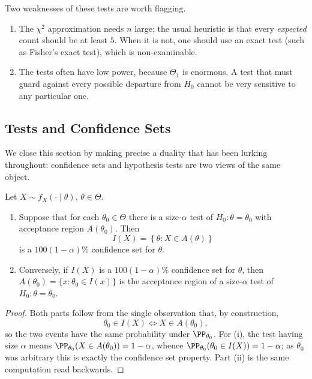 \begin{remark}
  Two weaknesses of these tests are worth flagging.
  \begin{enumerate}[label=(\roman*)]
    \item The $\chi^2$ approximation needs $n$ large; the usual heuristic is that every \emph{expected} count should be at least $5$. When it is not, one should use an exact test (such as Fisher's exact test), which is non-examinable.
    \item The tests often have low power, because $\Theta_1$ is enormous. A test that must guard against every possible departure from $H_0$ cannot be very sensitive to any particular one.
  \end{enumerate}
\end{remark}

\subsection{Tests and Confidence Sets}

We close this section by making precise a duality that has been lurking throughout: confidence sets and hypothesis tests are two views of the same object.

\begin{theorem}
  Let $X \sim f_X(\cdot\mid\theta)$, $\theta \in \Theta$.
  \begin{enumerate}[label=(\roman*)]
    \item Suppose that for each $\theta_0 \in \Theta$ there is a size-$\alpha$ test of $H_0 : \theta = \theta_0$ with acceptance region $A(\theta_0)$. Then
    $$
    I(X) = \left\{\theta : X \in A(\theta)\right\}
    $$
    is a $100(1-\alpha)\%$ confidence set for $\theta$.
    \item Conversely, if $I(X)$ is a $100(1-\alpha)\%$ confidence set for $\theta$, then $A(\theta_0) = \{x : \theta_0 \in I(x)\}$ is the acceptance region of a size-$\alpha$ test of $H_0 : \theta = \theta_0$.
  \end{enumerate}
\end{theorem}
\begin{proof}
  Both parts follow from the single observation that, by construction,
  $$
  \theta_0 \in I(X) \iff X \in A(\theta_0),
  $$
  so the two events have the same probability under $\PP_{\theta_0}$. For (i), the test having size $\alpha$ means $\PP_{\theta_0}(X\in A(\theta_0)) = 1-\alpha$, whence $\PP_{\theta_0}(\theta_0 \in I(X)) = 1-\alpha$; as $\theta_0$ was arbitrary this is exactly the confidence set property. Part (ii) is the same computation read backwards.
\end{proof}

